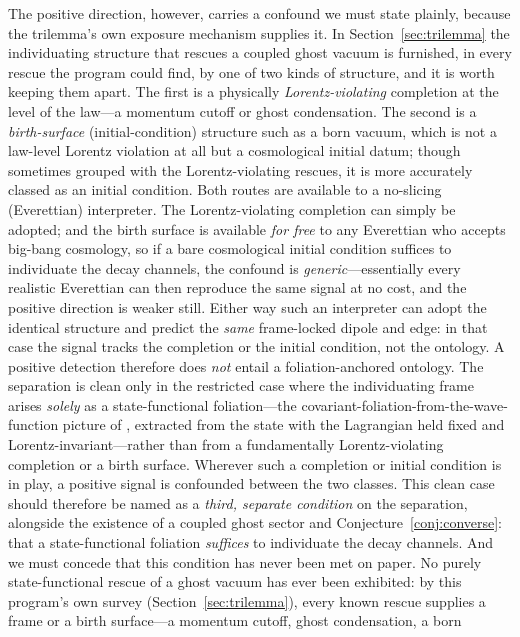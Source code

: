 \documentclass[11pt]{article}
\theoremstyle{remark}
\begin{document}
The positive direction, however, carries a confound we must state
plainly, because the trilemma's own exposure mechanism supplies it. In
Section~\ref{sec:trilemma} the individuating structure that rescues a
coupled ghost vacuum is furnished, in every rescue the program could
find, by one of two kinds of structure, and it is worth keeping them
apart. The first is a physically \emph{Lorentz-violating} completion at
the level of the law---a momentum cutoff or ghost condensation. The
second is a \emph{birth-surface} (initial-condition) structure such as
a born vacuum, which is not a law-level Lorentz violation at all but a
cosmological initial datum; though sometimes grouped with the
Lorentz-violating rescues, it is more accurately classed as an
initial condition. Both routes are available to a no-slicing
(Everettian) interpreter. The Lorentz-violating completion can simply
be adopted; and the birth surface is available \emph{for free} to any
Everettian who accepts big-bang cosmology, so if a bare cosmological
initial condition suffices to individuate the decay channels, the
confound is \emph{generic}---essentially every realistic Everettian
can then reproduce the same signal at no cost, and the positive
direction is weaker still. Either way such an interpreter can adopt the identical structure
and predict the \emph{same} frame-locked dipole and edge: in that case
the signal tracks the completion or the initial condition, not the
ontology. A positive detection therefore does \emph{not} entail a
foliation-anchored ontology. The
separation is clean only in the restricted case where the individuating
frame arises \emph{solely} as a state-functional foliation---the
covariant-foliation-from-the-wave-function picture of \cite{DGNSZ},
extracted from the state with the Lagrangian held fixed and
Lorentz-invariant---rather than from a fundamentally Lorentz-violating
completion or a birth surface. Wherever such a completion or initial
condition is in play, a positive signal is confounded between the two
classes. This clean case should therefore be named as a \emph{third,
separate condition} on the separation, alongside the existence of a
coupled ghost sector and Conjecture~\ref{conj:converse}: that a
state-functional foliation \emph{suffices} to individuate the decay
channels. And we must concede that this condition has never been met on
paper. No purely state-functional rescue of a ghost vacuum has ever
been exhibited: by this program's own survey
(Section~\ref{sec:trilemma}), every known rescue supplies a frame or a
birth surface---a momentum cutoff, ghost condensation, a born
\end{document}

